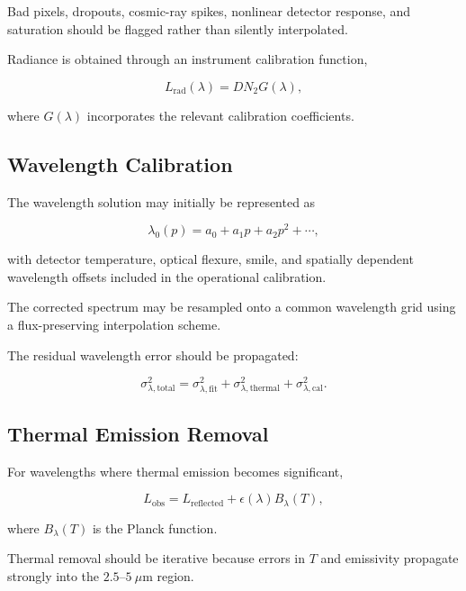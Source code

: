\documentclass[11pt,a4paper]{article}
\begin{document}
Bad pixels, dropouts, cosmic-ray spikes, nonlinear detector response, and saturation should be flagged rather than silently interpolated.

Radiance is obtained through an instrument calibration function,

\begin{equation}
L_{\mathrm{rad}}(\lambda)
=
DN_2 G(\lambda),
\end{equation}

where $G(\lambda)$ incorporates the relevant calibration coefficients.

\subsection{Wavelength Calibration}

The wavelength solution may initially be represented as

\begin{equation}
\lambda_0(p)
=
a_0+a_1p+a_2p^2+\cdots,
\end{equation}

with detector temperature, optical flexure, smile, and spatially dependent wavelength offsets included in the operational calibration.

The corrected spectrum may be resampled onto a common wavelength grid using a flux-preserving interpolation scheme.

The residual wavelength error should be propagated:

\begin{equation}
\sigma_{\lambda,\mathrm{total}}^2
=
\sigma_{\lambda,\mathrm{fit}}^2
+
\sigma_{\lambda,\mathrm{thermal}}^2
+
\sigma_{\lambda,\mathrm{cal}}^2.
\end{equation}

\subsection{Thermal Emission Removal}

For wavelengths where thermal emission becomes significant,

\begin{equation}
L_{\mathrm{obs}}
=
L_{\mathrm{reflected}}
+
\epsilon(\lambda)B_\lambda(T),
\end{equation}

where $B_\lambda(T)$ is the Planck function.

Thermal removal should be iterative because errors in $T$ and emissivity propagate strongly into the $2.5$--$5~\mu$m region.
\end{document}
